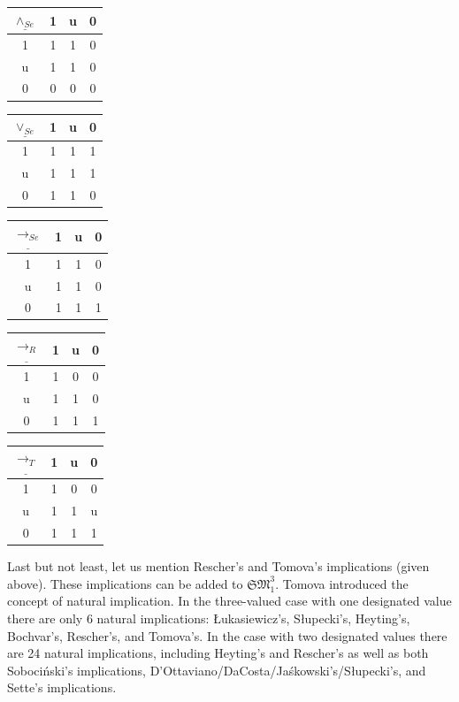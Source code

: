 \documentclass[10pt,a4paper]{article}
\theoremstyle{definition}
\newcommand{\3}{\vspace{.3in}}
\newcommand{\2}{\vspace{.2in}}
\newcommand{\1}{\vspace{.1in}}
\newcommand{\5}{\vspace{.05in}}
\begin{document}
	
	\begin{center}
		\begin{tabular}{|c|ccc|}
			\hline
			$\underline{\wedge_{Se}} $ & 1 & u & 0 \\
			\hline
			1 & 1 & 1 & 0 \\
			u & 1 & 1 & 0 \\
			0 & 0 & 0 & 0 \\
			\hline
		\end{tabular}
		\begin{tabular}{|c|ccc|}
			\hline$\underline{\vee_{Se}} $ & 1 & u & 0 \\\hline
			1 & 1 & 1 & 1 \\
			u & 1 & 1 & 1 \\
			0 & 1 & 1 & 0 \\\hline
		\end{tabular}
		\begin{tabular}{|c|ccc|}
			\hline
			$\underline{\rightarrow_{Se}} $ & 1 & u & 0 \\
			\hline
			1 & 1 & 1 & 0 \\
			u & 1 & 1 & 0 \\
			0 & 1 & 1 & 1 \\
			\hline
		\end{tabular}
\end{center} 
\begin{center}		
	\begin{tabular}{|c|ccc|}
		\hline
		$\underline{\rightarrow_R} $ & 1 & u & 0 \\
		\hline
		1 & 1 & 0 & 0 \\
		u & 1 & 1 & 0 \\
		0 & 1 & 1 & 1 \\
		\hline
	\end{tabular}
	\begin{tabular}{|c|ccc|}
		\hline
		$\underline{\rightarrow_T} $ & 1 & u & 0 \\
		\hline
		1 & 1 & 0 & 0 \\
		u & 1 & 1 & u \\
		0 & 1 & 1 & 1 \\
		\hline
	\end{tabular}
	
\end{center}

Last but not least, let us mention Rescher's \cite{Rescher} and Tomova's \cite{Tomova12} implications (given above). These implications can be added to $\mathfrak{SM}_1^3$. Tomova \cite{Tomova12} introduced the concept of natural implication. In the three-valued case with one designated value there are only 6 natural implications: \L ukasiewicz's, S\l{}upecki's, Heyting's, Bochvar's, Rescher's, and Tomova's. In the case with two designated values there are 24 natural implications, including Heyting's and Rescher's as well as both Soboci\'{n}ski's implications, D'Ottaviano/DaCosta/Ja\'{s}kowski's/S\l{}upecki's, and Sette's implications.
\end{document}
